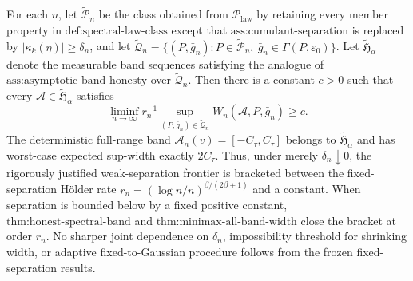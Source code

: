 For each \(n\), let \(\widetilde{\mathcal P}_n\) be the class obtained from \(\mathcal P_{\mathrm{law}}\) by retaining every member property in \(\text{def:spectral-law-class}\) except that \(\text{ass:cumulant-separation}\) is replaced by \(|\kappa_k(\eta)|\ge\delta_n\), and let \(\widetilde{\mathcal Q}_n=\{(P,\bar g_n):P\in\widetilde{\mathcal P}_n,\ \bar g_n\in\Gamma(P,\varepsilon_0)\}\).  Let \(\widetilde{\mathfrak H}_\alpha\) denote the measurable band sequences satisfying the analogue of \(\text{ass:asymptotic-band-honesty}\) over \(\widetilde{\mathcal Q}_n\).  Then there is a constant \(c>0\) such that every \(\mathcal A\in\widetilde{\mathfrak H}_\alpha\) satisfies
\[
 \liminf_{n\to\infty}r_n^{-1}
 \sup_{(P,\bar g_n)\in\widetilde{\mathcal Q}_n}
 W_n(\mathcal A,P,\bar g_n)\ge c.
\]
The deterministic full-range band \(\mathcal A_n(v)=[-C_\tau,C_\tau]\) belongs to \(\widetilde{\mathfrak H}_\alpha\) and has worst-case expected sup-width exactly \(2C_\tau\).  Thus, under merely \(\delta_n\downarrow0\), the rigorously justified weak-separation frontier is bracketed between the fixed-separation H\"older rate \(r_n=(\log n/n)^{\beta/(2\beta+1)}\) and a constant.  When separation is bounded below by a fixed positive constant, \(\text{thm:honest-spectral-band}\) and \(\text{thm:minimax-all-band-width}\) close the bracket at order \(r_n\).  No sharper joint dependence on \(\delta_n\), impossibility threshold for shrinking width, or adaptive fixed-to-Gaussian procedure follows from the frozen fixed-separation results.